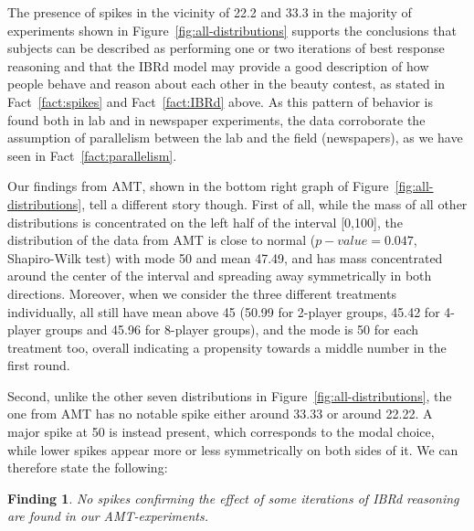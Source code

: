 \documentclass[12pt,review]{elsarticle}
\newtheorem{fdn}{Finding}
\begin{document}
The presence of spikes in the vicinity of 22.2 and 33.3 in the majority of experiments shown in Figure~\ref{fig:all-distributions} supports the conclusions that subjects can be described as performing one or two iterations of best response reasoning and that the IBRd model may provide a good description of how people behave and reason about each other in the beauty contest, as stated in Fact~\ref{fact:spikes} and Fact~\ref{fact:IBRd} above. As this pattern of behavior
is found both in lab and in newspaper experiments, the data
corroborate the assumption of parallelism between the lab and the
field (newspapers), as we have seen in Fact~\ref{fact:parallelism}.

Our findings from AMT, shown in the bottom right graph of Figure~\ref{fig:all-distributions},
tell a different story though. First of all, while the mass of all other
distributions is concentrated on the left half of the interval {[}0,100{]},
the distribution of the data from AMT is close to normal ($p-value=0.047$, Shapiro-Wilk test) with mode 50 and mean 47.49, and has mass concentrated around the center of
the interval and spreading away symmetrically in both directions.
Moreover, when we consider the three different treatments individually, all still have mean above 45 (50.99
for 2-player groups, 45.42 for 4-player groups and 45.96 for 8-player
groups), and the mode is 50 for each treatment too, overall indicating
a propensity towards a middle number in the first round.

Second, unlike the other seven distributions in Figure~\ref{fig:all-distributions},
the one from AMT has no notable spike either around 33.33 or around
22.22. A major spike at 50 is instead present, which corresponds to
the modal choice, while lower spikes appear more or less symmetrically
on both sides of it. We can therefore state the following:

\begin{fdn}
No spikes confirming the effect of some iterations of IBRd reasoning are found in our AMT-experiments.
\end{fdn}

%
\end{document}
